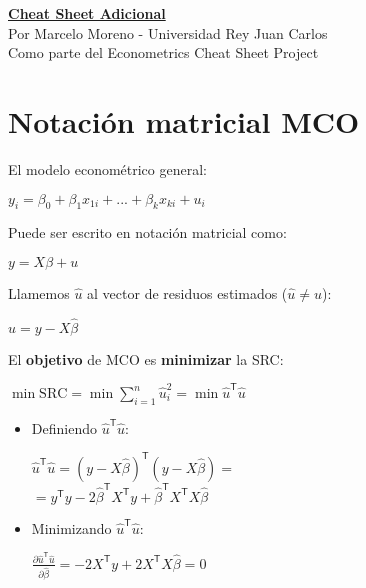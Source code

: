 \documentclass[10pt, a4paper, landscape]{extarticle}
\newcommand{\SRC}{\mathrm{SRC}}
\newcommand{\tr}{\mathsf{T}}
\begin{document}
\setlength{\footskip}{12pt}

\begin{multicols}{3} %
\begin{center}
	\textbf{\LARGE \href{https://github.com/marcelomijas/econometrics-cheatsheet}{Cheat Sheet Adicional}} \\
	{\footnotesize Por Marcelo Moreno - Universidad Rey Juan Carlos} \\
	{\footnotesize Como parte del Econometrics Cheat Sheet Project}
\end{center}
\section*{Notación matricial MCO}
	El modelo econométrico general:
	\begin{center}
		$y_i = \beta_0 + \beta_1 x_{1i} + ... + \beta_k x_{ki} + u_i$
	\end{center}
	Puede ser escrito en notación matricial como:
	\begin{center}
		$y = X \beta + u$
	\end{center}
	Llamemos $\hat{u}$ al vector de residuos estimados ($\hat{u} \neq u$):
	\begin{center}
		$\hat{u} = y - X \hat{\beta}$
	\end{center}
	El \textbf{objetivo} de MCO es \textbf{minimizar} la SRC:
	\begin{center}
		$\min \SRC = \min \sum_{i=1}^n \hat{u}_i^2 = \min \hat{u}^\tr \hat{u}$
	\end{center}
	\begin{itemize}[leftmargin=*]
		\item Definiendo $\hat{u}^\tr \hat{u}$:
		\begin{center}
			$\hat{u}^\tr \hat{u} = (y - X \hat{\beta})^\tr (y - X \hat{\beta}) =$ \\
			$= y^\tr y -2 \hat{\beta}^\tr X^\tr y + \hat{\beta}^\tr X^\tr X \hat{\beta}$
		\end{center}
		\item Minimizando $\hat{u}^\tr \hat{u}$:
		\begin{center}
			$\frac{\partial \hat{u}^\tr \hat{u}}{\partial \hat{\beta}} = -2 X^\tr y +2 X^\tr X \hat{\beta} = 0$ \\

\end{center}
\end{itemize}
\end{multicols}
\end{document}
